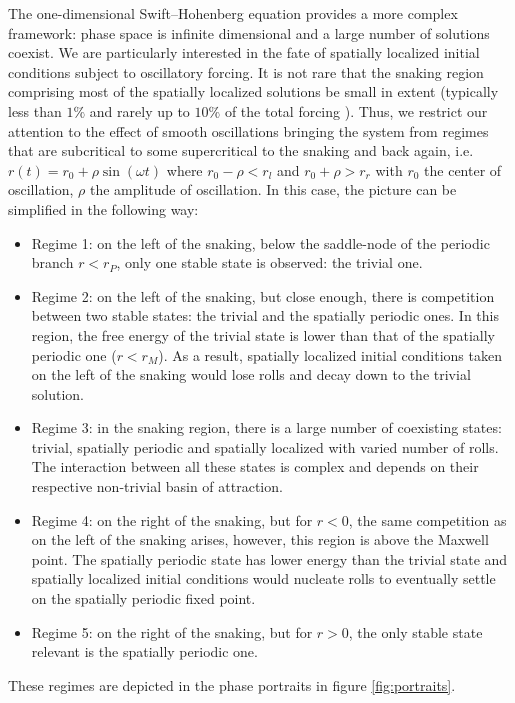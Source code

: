 \documentclass[../main/TimeForcingSHE.tex]{subfiles}
\begin{document}
The one-dimensional Swift--Hohenberg equation provides a more complex framework: phase space is infinite dimensional and a large number of solutions coexist.
We are particularly interested in the fate of spatially localized initial conditions subject to oscillatory forcing.
It is not rare that the snaking region comprising most of the spatially localized solutions be small in extent (typically less than $1\%$ \cite{Batiste2006spatially,Schneider2010snakes,Beaume2013localized} and rarely up to $10\%$ of the total forcing \cite{Beaume2013convectons}).
Thus, we restrict our attention to the effect of smooth oscillations bringing the system from regimes that are subcritical to some supercritical to the snaking and back again, i.e. $r(t) = r_0 + \rho \sin(\omega t)$ where $r_0 - \rho < r_{l}$ and $r_0 + \rho > r_{r}$ with $r_0$ the center of oscillation, $\rho$ the amplitude of oscillation.
In this case, the picture can be simplified in the following way:
\begin{itemize}
\item Regime 1: on the left of the snaking, below the saddle-node of the periodic branch $r<r_P$, only one stable state is observed: the trivial one.
\item Regime 2: on the left of the snaking, but close enough, there is competition between two stable states: the trivial and the spatially periodic ones. In this region, the free energy of the trivial state is lower than that of the spatially periodic one ($r<r_M$). As a result, spatially localized initial conditions taken on the left of the snaking would lose rolls and decay down to the trivial solution.
\item Regime 3: in the snaking region, there is a large number of coexisting states: trivial, spatially periodic and spatially localized with varied number of rolls. The interaction between all these states is complex and depends on their respective non-trivial basin of attraction.
\item Regime 4: on the right of the snaking, but for $r<0$, the same competition as on the left of the snaking arises, however, this region is above the Maxwell point. The spatially periodic state has lower energy than the trivial state and spatially localized initial conditions would nucleate rolls to eventually settle on the spatially periodic fixed point.
\item Regime 5: on the right of the snaking, but for $r>0$, the only stable state relevant is the spatially periodic one.
\end{itemize}
These regimes are depicted in the phase portraits in figure \ref{fig:portraits}.
\end{document}
